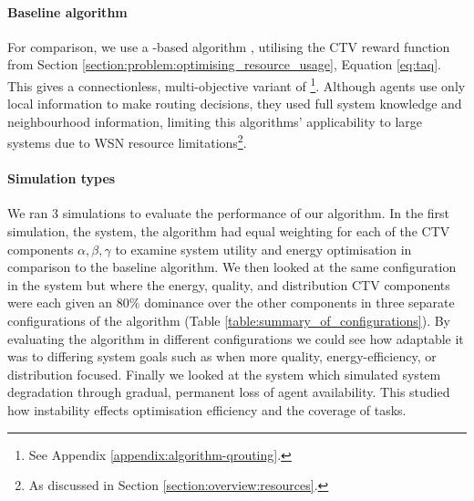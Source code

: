 \paragraph{Baseline algorithm}
For comparison, we use a \acronymBaseline{}{}-based algorithm \citep{Boyan, Zhang2004, Al-Rawi2015}, utilising the CTV reward function from Section \ref{section:problem:optimising_resource_usage}, Equation \ref{eq:taq}. This gives a connectionless, multi-objective variant of \acronymBaseline{}{}\footnote{See Appendix \ref{appendix:algorithm-qrouting}.}. Although agents use only local information to make routing decisions, they used full system knowledge and neighbourhood information, limiting this algorithms' applicability to large systems due to WSN resource limitations\footnote{As discussed in Section \ref{section:overview:resources}.}. 

\paragraph{Simulation types}
We ran $3$ simulations to evaluate the performance of our algorithm. In the first simulation, the \simulationSimple{}{} system,  the \acronymWSNOptimisation{}{} algorithm had
equal weighting for each of the CTV components $\alpha, \beta, \gamma$ to examine system utility and energy optimisation in comparison to the \acronymBaseline{}{} baseline algorithm.  We then looked at the same configuration in the \simulationExtended{}{} system but where the energy, quality, and distribution CTV components were each given an $80\%$ dominance over the other components in three separate configurations of the algorithm (Table \ref{table:summary_of_configurations}). By evaluating the algorithm in different configurations we could see how adaptable it was to differing system goals such as when more quality, energy-efficiency, or distribution focused. Finally we looked at the \simulationNodeFailure{}{} system which simulated system degradation through gradual, permanent loss of agent availability. This studied how instability effects optimisation efficiency and the coverage of tasks.  

